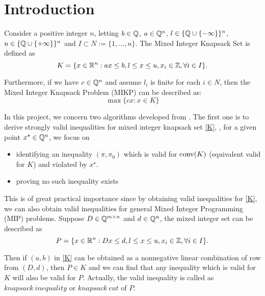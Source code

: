 \documentclass[a4paper,11pt]{article}
\begin{document}


\tableofcontents
\newpage

\section{Introduction} 
Consider a positive integer $n$, letting $b\in\mathbb{Q}$, $a\in \mathbb{Q}^n$, $l\in \{\mathbb{Q}\cup \{-\infty\}\}^n$, $u\in \{\mathbb{Q}\cup \{+\infty\}\}^n$ and $I\subset N :=
\{1,...,n\}$. The Mixed Integer Knapsack Set is defined as
\begin{equation}\label{K}
 K=\{x\in \mathbb{R}^n : ax\leq b, l\leq x\leq u, x_i\in \mathbb{Z}, \forall i\in I\}.
\end{equation}

Furthermore, if we have $c\in \mathbb{Q}^n$ and assume $l_i$ is finite for each $i\in N$, then the Mixed Integer Knapsack Problem (MIKP) can be 
described as:
\begin{equation}\label{MIKP}
 \max \{cx:x\in K\}
\end{equation}


In this project, we concern two algorithms developed from \cite{fukasawa2011exact}. The first one is to derive strongly valid inequalities for mixed integer knapsack set \eqref{K}, \ie, for a given 
point $x^\star\in \mathbb{Q}^n$, we focus on
\begin{itemize}
 \item identifying an inequality $(\pi,\pi_0)$ which is valid for $\operatorname{conv}(K)$ (equivalent valid for $K$) and violated by $x^\star$.
 \item proving no such inequality exists
\end{itemize}

This is of great practical importance since by obtaining valid inequalities for \eqref{K}, we can also obtain valid inequalities for general Mixed Integer Programming 
(MIP) problems. Suppose $D\in \mathbb{Q}^{m\times n}$ and $d\in \mathbb{Q}^n$, the mixed integer set can be described as
\begin{equation}\label{P}
 P=\{x\in \mathbb{R}^n: Dx\leq d, l\leq x\leq u, x_i\in \mathbb{Z}, \forall i \in I\}.
\end{equation}

Then if $(a,b)$ in \eqref{K} can be obtained as a nonnegative linear combination of row from $(D,d)$, then $P\in K$ and we can find that any inequality
 which is valid for  $K$ will also be valid for $P$. Actually, the valid inequality is called as $knapsack~inequality$ or $knapsack~cut$ of $P$.
 
\end{document}
